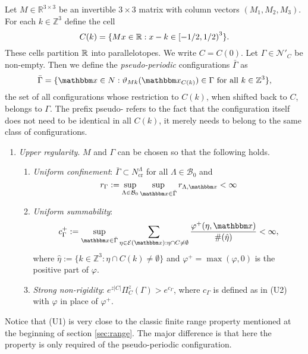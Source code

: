 Let $M\in\mathbb R^{3\times 3}$ be an invertible $3\times 3$ matrix with column vectors $(M_1,M_2,M_3)$. For each $k \in \mathbb Z^3$ define the cell
$$C(k) =  \{Mx \in \mathbb{R}: x-k \in \left[ -1/2, 1/2 \right)^3 \}.$$
These cells partition $\mathbb{R}$ into parallelotopes. We write $C=C(0)$. Let $\Gamma \in \mathcal N'_C$ be non-empty. Then we define the \textit{pseudo-periodic} configurations $\bar \Gamma$ as
$$\bar \Gamma = \{ \x \in N: \vartheta_{Mk}(\x_{C(k)}) \in \Gamma \text{ for all } k \in \mathbb Z^3 \},$$
the set of all configurations whose restriction to $C(k)$, when shifted back to $C$, belongs to $\Gamma$. The prefix pseudo- refers to the fact that the configuration itself does not need to be identical in all $C(k)$, it merely needs to belong to the same class of configurations.

\begin{enumerate}[\textbf{(U)}] 
	\item \textit{Upper regularity}. $M$ and $\Gamma$ can be chosen so that the following holds. 
		\begin{enumerate}[(U1)]
			\item \textit{Uniform confinement}: $\bar \Gamma \subset N^\Lambda_\text{cr}$ for all $\Lambda \in \mathcal B_0$ and 
			$$r_\Gamma := \sup_{\Lambda\in\mathcal B_0}\sup_{\x \in \bar\Gamma} r_{\Lambda, \x} < \infty$$
			\item \textit{Uniform summability}: 
			$$c^+_\Gamma := \sup_{\x \in \bar\Gamma}  \sum_{\eta \in \mathcal E(\x): \eta \cap C \neq \emptyset} \frac{\varphi^+(\eta,\x)}{\#(\hat\eta)} < \infty,$$
where $\hat\eta := \{k \in \mathbb Z^3: \eta \cap C(k) \neq \emptyset\}$ and $\varphi^+ = \max(\varphi,0)$ is the positive part of $\varphi$.
\item \textit{Strong non-rigidity}: $e^{z|C|} \Pi^z_C(\Gamma) > e^{c_\Gamma}$, where $c_\Gamma$ is defined as in (U2) with $\varphi$ in place of $\varphi^+$.
		\end{enumerate}
\end{enumerate}

Notice that (U1) is very close to the classic finite range property mentioned at the beginning of section \ref{sec:range}. The major difference is that here the property is only required of the pseudo-periodic configuration.


